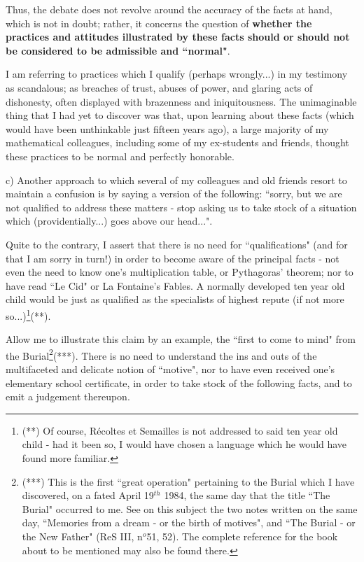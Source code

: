 Thus, the debate does not revolve around the accuracy of the facts at hand, which is not in doubt; rather, it concerns the question of \textbf{whether the practices and attitudes illustrated by these facts should or should not be considered to be admissible and ``normal"}.

I am referring to practices which I qualify (perhaps wrongly...) in my testimony as scandalous; as breaches of trust, abuses of power, and glaring acts of dishonesty, often displayed with brazenness and iniquitousness. The unimaginable thing that I had yet to discover was that, upon learning about these facts (which would have been unthinkable just fifteen years ago), a large majority of my mathematical colleagues, including some of my ex-students and friends, thought these practices to be normal and perfectly honorable. 

c) Another approach to which several of my colleagues and old friends resort to maintain a confusion is by saying a version of the following: ``sorry, but we are not qualified to address these matters - stop asking us to take stock of a situation which (providentially...) goes above our head...".

Quite to the contrary, I assert that there is no need for ``qualifications" (and for that I am sorry in turn!) in order to become aware of the principal facts - not even the need to know one's multiplication table, or Pythagoras' theorem; nor to have read ``Le Cid" or La Fontaine's Fables. A normally developed ten year old child would be just as qualified as the specialists of highest repute (if not more so...)\footnote{(**) Of course, R\'ecoltes et Semailles is not addressed to said ten year old child - had it been so, I would have chosen a language which he would have found more familiar.}(**).

Allow me to illustrate this claim by an example, the ``first to come to mind" from the Burial\footnote{(***) This is the first ``great operation" pertaining to the Burial which I have discovered, on a fated April 19$^{th}$ 1984, the same day that the title ``The Burial" occurred to me. See on this subject the two notes written on the same day, ``Memories from a dream - or the birth of motives", and ``The Burial - or the New Father" (ReS III, n$^o$51, 52). The complete reference for the book about to be mentioned may also be found there.}(***). There is no need to understand the ins and outs of the multifaceted and delicate notion of ``motive", nor to have even received one's elementary school certificate, in order to take stock of the following facts, and to emit a judgement thereupon.

